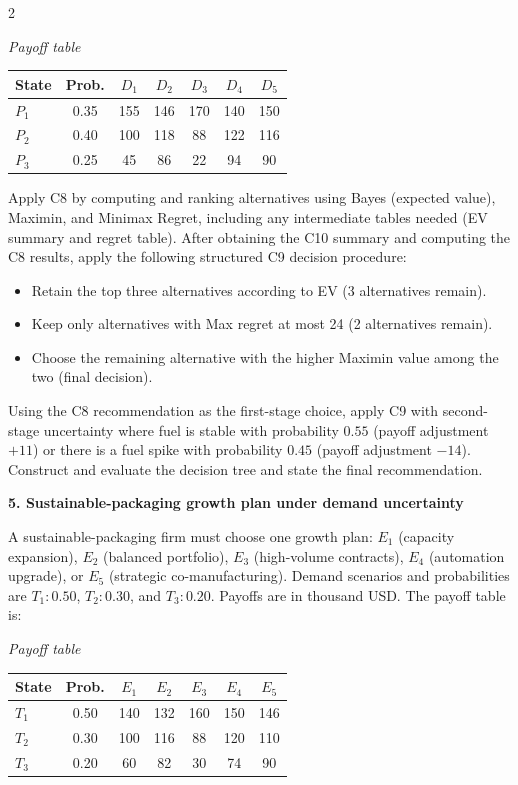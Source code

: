 \documentclass[12pt]{article}
\newcommand{\SubsectionBox}[1]{%
	\noindent\colorbox{gray!30}{%
		\parbox{\linewidth}{\textbf{#1}}%
	}\par\vspace{0.35cm}%
}
\begin{document}
\begin{multicols}{2}
		\begin{center}
			\textit{Payoff table} \\
			\begin{tabular}{l c c c c c c}
				\hline
				State& Prob. & $D_1$ & $D_2$ & $D_3$ & $D_4$ & $D_5$ \\
				\hline
				$P_1$ & 0.35 & 155 & 146 & 170 & 140 & 150 \\
				$P_2$ & 0.40 & 100 & 118 & 88 & 122 & 116 \\
				$P_3$ & 0.25 & 45 & 86 & 22 & 94 & 90 \\
				\hline
			\end{tabular}
		\end{center}
		
		Apply C8 by computing and ranking alternatives using Bayes (expected value), Maximin, and Minimax Regret, including any intermediate tables needed (EV summary and regret table).
		After obtaining the C10 summary and computing the C8 results, apply the following structured C9 decision procedure:
		\begin{itemize}
			\item Retain the top three alternatives according to EV (3 alternatives remain).
			\item Keep only alternatives with Max regret at most 24 (2 alternatives remain).
			\item Choose the remaining alternative with the higher Maximin value among the two (final decision).
		\end{itemize}
		Using the C8 recommendation as the first-stage choice, apply C9 with second-stage uncertainty where fuel is stable with probability $0.55$ (payoff adjustment $+11$) or there is a fuel spike with probability $0.45$ (payoff adjustment $-14$). Construct and evaluate the decision tree and state the final recommendation.
		
		\vspace{0.25cm}
		\SubsectionBox{5. Sustainable-packaging growth plan under demand uncertainty}\vspace{-0.25cm}
		A sustainable-packaging firm must choose one growth plan: $E_1$ (capacity expansion), $E_2$ (balanced portfolio), $E_3$ (high-volume contracts), $E_4$ (automation upgrade), or $E_5$ (strategic co-manufacturing).
		Demand scenarios and probabilities are $T_1:0.50$, $T_2:0.30$, and $T_3:0.20$. Payoffs are in thousand USD. The payoff table is:
		
		\begin{center}
			\textit{Payoff table} \\
			\begin{tabular}{l c c c c c c}
				\hline
				State& Prob. & $E_1$ & $E_2$ & $E_3$ & $E_4$ & $E_5$ \\
				\hline
				$T_1$ & 0.50 & 140 & 132 & 160 & 150 & 146 \\
				$T_2$ & 0.30 & 100 & 116 & 88 & 120 & 110 \\
				$T_3$ & 0.20 & 60 & 82 & 30 & 74 & 90 \\
				\hline
			\end{tabular}
		\end{center}
		

\end{multicols}
\end{document}
